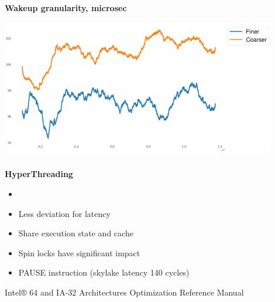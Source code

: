\documentclass[usenames,dvipsnames, 18pt, compress, aspectratio=169]{beamer}
\begin{document}
\begin{frame}
    \frametitle{}
    \begin{center}
    \textbf{Wakeup granularity, microsec}

        \vspace{0.5cm}
        \includegraphics[width=0.9\textwidth,center]{wakeup_granularity.png}

    \end{center}
\end{frame}

\begin{frame}
    \frametitle{}
    \begin{center}
    \textbf{HyperThreading}

        \begin{itemize}
            \item <+->
        \end{itemize}

        \begin{itemize}[label={\MVRightarrow}]
            \item <+-> Less deviation for latency
            \item <+-> Share execution state and cache
            \item <+-> Spin locks have significant impact
            \item <+-> PAUSE instruction (skylake latency 140 cycles)
        \end{itemize}

        \normalsize{Intel® 64 and IA-32 Architectures Optimization Reference Manual}
    \end{center}
\end{frame}
\end{document}
